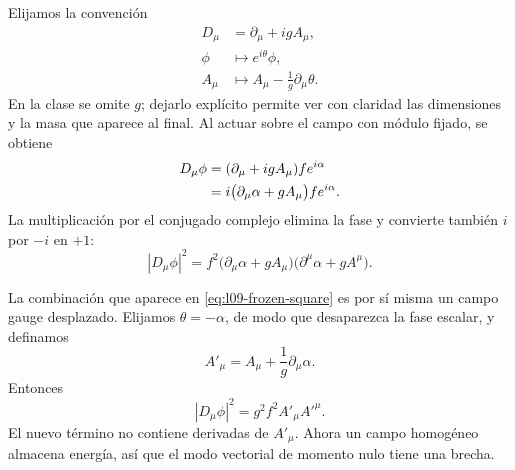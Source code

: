 Elijamos la convención
\begin{equation}
\begin{aligned}
  D_\mu&=\partial_\mu+igA_\mu,
  \\
  \phi&\longmapsto e^{i\theta}\phi,
  \\
  A_\mu&\longmapsto A_\mu-\frac1g\partial_\mu\theta .
\end{aligned}
  \label{eq:l09-gauge-convention}
\end{equation}
En la clase se omite \(g\); dejarlo explícito permite ver con claridad las dimensiones y la masa que aparece al final. Al actuar sobre el campo con módulo fijado, se obtiene
\begin{align}
  D_\mu\phi
  &=(\partial_\mu+igA_\mu)f e^{i\alpha}
  \notag\\
  &=i\bigl(\partial_\mu\alpha+gA_\mu\bigr)
    f e^{i\alpha}.
  \label{eq:l09-covariant-frozen}
\end{align}
La multiplicación por el conjugado complejo elimina la fase y convierte también \(i\) por \(-i\) en \(+1\):
\begin{equation}
  |D_\mu\phi|^2
  =f^2
   \bigl(\partial_\mu\alpha+gA_\mu\bigr)
   \bigl(\partial^\mu\alpha+gA^\mu\bigr).
  \label{eq:l09-frozen-square}
\end{equation}

\begin{classroomqa}
\end{classroomqa}

La combinación que aparece en \eqref{eq:l09-frozen-square} es por sí misma un campo gauge desplazado. Elijamos \(\theta=-\alpha\), de modo que desaparezca la fase escalar, y definamos
\begin{equation}
  A'_\mu=A_\mu+\frac1g\partial_\mu\alpha .
  \label{eq:l09-unitary-gauge-field}
\end{equation}
Entonces
\begin{equation}
  |D_\mu\phi|^2=g^2f^2 A'_\mu A'^\mu .
  \label{eq:l09-vector-mass-term}
\end{equation}
El nuevo término no contiene derivadas de \(A'_\mu\). Ahora un campo homogéneo almacena energía, así que el modo vectorial de momento nulo tiene una brecha.

